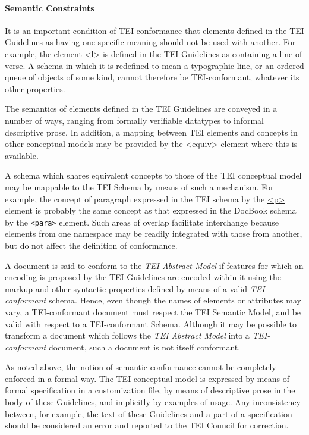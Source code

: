 \paragraph[{Semantic Constraints}]{Semantic Constraints}\label{CFAMsc}\par
It is an important condition of TEI conformance that elements defined in the TEI Guidelines as having one specific meaning should not be used with another. For example, the element \hyperref[TEI.l]{<l>} is defined in the TEI Guidelines as containing a line of verse. A schema in which it is redefined to mean a typographic line, or an ordered queue of objects of some kind, cannot therefore be TEI-conformant, whatever its other properties.\par
The semantics of elements defined in the TEI Guidelines are conveyed in a number of ways, ranging from formally verifiable datatypes to informal descriptive prose. In addition, a mapping between TEI elements and concepts in other conceptual models may be provided by the \hyperref[TEI.equiv]{<equiv>} element where this is available.\par
A schema which shares equivalent concepts to those of the TEI conceptual model may be mappable to the TEI Schema by means of such a mechanism. For example, the concept of paragraph expressed in the TEI schema by the \hyperref[TEI.p]{<p>} element is probably the same concept as that expressed in the DocBook schema by the \texttt{<para>} element. Such areas of overlap facilitate interchange because elements from one namespace may be readily integrated with those from another, but do not affect the definition of conformance.\par
A document is said to conform to the \textit{TEI Abstract Model} if features for which an encoding is proposed by the TEI Guidelines are encoded within it using the markup and other syntactic properties defined by means of a valid \textit{TEI-conformant} schema. Hence, even though the names of elements or attributes may vary, a TEI-conformant document must respect the TEI Semantic Model, and be valid with respect to a TEI-conformant Schema. Although it may be possible to transform a document which follows the \textit{TEI Abstract Model} into a \textit{TEI-conformant} document, such a document is not itself conformant.\par
As noted above, the notion of semantic conformance cannot be completely enforced in a formal way. The TEI conceptual model is expressed by means of formal specification in a customization file, by means of descriptive prose in the body of these Guidelines, and implicitly by examples of usage. Any inconsistency between, for example, the text of these Guidelines and a part of a specification should be considered an error and reported to the TEI Council for correction. 
